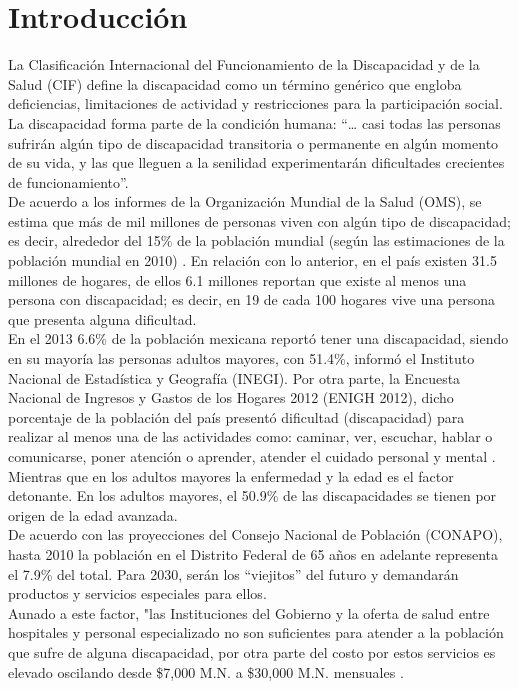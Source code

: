 \chapter{Introducci\'on}

La Clasificación Internacional del Funcionamiento de la Discapacidad y de la Salud (CIF) define la discapacidad como un término genérico que engloba deficiencias, limitaciones de actividad y restricciones para la participación social. La discapacidad forma parte de la condición humana: “… casi todas las personas sufrirán algún tipo de discapacidad transitoria o permanente en algún momento de su vida, y las que lleguen a la senilidad experimentarán dificultades crecientes de funcionamiento”. \\

De acuerdo a los informes de la Organización Mundial de la Salud (OMS), se estima que más de mil millones de personas viven con algún tipo de discapacidad; es decir, alrededor del 15\% de la población mundial (según las estimaciones de la población mundial en 2010) \cite{uno}. En relación con lo anterior, en el país existen 31.5 millones de hogares, de ellos 6.1 millones reportan que existe al menos una persona con discapacidad; es decir, en 19 de cada 100 hogares vive una persona que presenta alguna dificultad. \\

En el 2013 6.6\% de la población mexicana reportó tener una discapacidad, siendo en su mayoría las personas adultos mayores, con 51.4\%, informó el Instituto Nacional de Estadística y Geografía (INEGI). Por otra parte, la Encuesta Nacional de Ingresos y Gastos de los Hogares 2012 (ENIGH 2012), dicho porcentaje de la población del país presentó dificultad (discapacidad) para realizar al menos una de las actividades como: caminar, ver, escuchar, hablar o comunicarse, poner atención o aprender, atender el cuidado personal y mental \cite{dos}. Mientras que en los adultos mayores la enfermedad y la edad es el factor detonante. En los adultos mayores, el 50.9\% de las discapacidades se tienen por origen de la edad avanzada. \\
De acuerdo con las proyecciones del Consejo Nacional de Población (CONAPO), hasta 2010 la población en el Distrito Federal de 65 años en adelante representa el 7.9\% del total. Para 2030, serán los “viejitos” del futuro y demandarán productos y servicios especiales para ellos. \\

Aunado a este factor, "las Instituciones del Gobierno y la oferta de salud entre hospitales y personal especializado no son suficientes para atender a la población que sufre de alguna discapacidad, por otra parte del costo por estos servicios es elevado oscilando desde \$7,000 M.N. a \$30,000 M.N. mensuales \cite{tres}. \\

